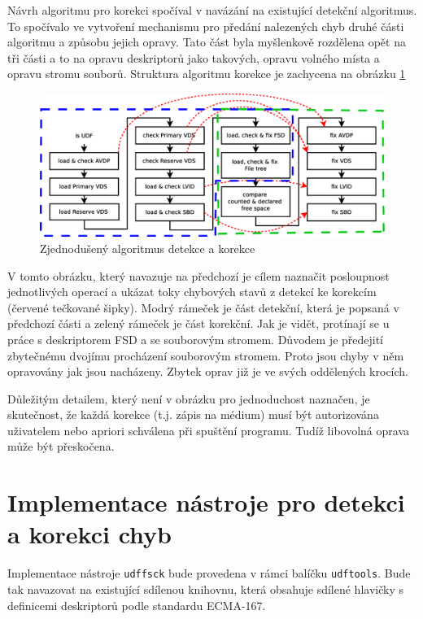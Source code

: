 Návrh algoritmu pro korekci spočíval v navázání na existující detekční algoritmus. To spočívalo ve vytvoření mechanismu pro předání nalezených chyb druhé části algoritmu a způsobu jejich opravy. Tato část byla myšlenkově rozdělena opět na tři části a to na opravu deskriptorů jako takových, opravu volného místa a opravu stromu souborů. Struktura algoritmu korekce je zachycena na obrázku \ref{fig:steps-korekce}
\begin{figure}[h] 
    \centering
    \includegraphics[scale=0.4]{obrazky/steps-korekce.eps}
    \caption{Zjednodušený algoritmus detekce a korekce}
    \label{fig:steps-korekce}
\end{figure}
V tomto obrázku, který navazuje na předchozí je cílem naznačit posloupnost jednotlivých operací a ukázat toky chybových stavů z detekcí ke korekcím (červené tečkované šipky). Modrý rámeček je část detekční, která je popsaná v předchozí části a zelený rámeček je část korekční. Jak je vidět, protínají se u práce s deskriptorem FSD a se souborovým stromem. Důvodem je předejití zbytečnému dvojímu procházení souborovým stromem. Proto jsou chyby v něm opravovány jak jsou nacházeny. Zbytek oprav již je ve svých oddělených krocích.

Důležitým detailem, který není v obrázku pro jednoduchost naznačen, je skutečnost, že každá korekce (t.j. zápis na médium) musí být autorizována uživatelem nebo apriori schválena při spuštění programu. Tudíž libovolná oprava může být přeskočena.

\section{Implementace nástroje pro detekci a korekci chyb}
\label{sec:implementace}
Implementace nástroje \texttt{udffsck} bude provedena v rámci balíčku \texttt{udftools}. Bude tak navazovat na existující sdílenou knihovnu, která obsahuje sdílené hlavičky s definicemi deskriptorů podle standardu ECMA-167.

